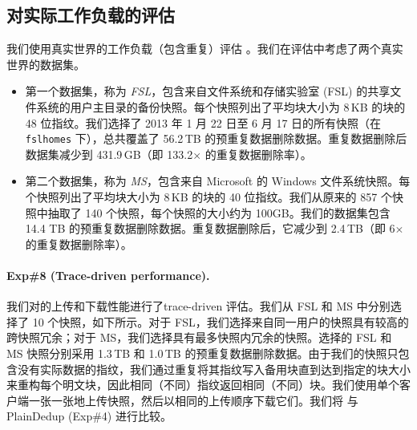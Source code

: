 \subsection{对实际工作负载的评估}
\label{subsec:real-world}

我们使用真实世界的工作负载（包含重复）评估 \sysnameS。我们在评估中考虑了两个真实世界的数据集。
\begin{itemize}[leftmargin=*]
\item 第一个数据集，称为 \textit{ FSL}，包含来自文件系统和存储实验室 (FSL) \cite{fsl,sun16} 的共享文件系统的用户主目录的备份快照。每个快照列出了平均块大小为 8\,KB 的块的 48 位指纹。我们选择了 2013 年 1 月 22 日至 6 月 17 日的所有快照（在 \texttt{fslhomes} 下），总共覆盖了 56.2\,TB 的预重复数据删除数据。重复数据删除后数据集减少到 431.9\,GB（即 133.2$\times$ 的重复数据删除率）。
\item 第二个数据集，称为 \textit{ MS}，包含来自 Microsoft \cite{meyer11} 的 Windows 文件系统快照。每个快照列出了平均块大小为 8\,KB 的块的 40 位指纹。我们从原来的 857 个快照中抽取了 140 个快照，每个快照的大小约为 100GB。我们的数据集包含 14.4 TB 的预重复数据删除数据。重复数据删除后，它减少到 2.4\,TB（即 6$\times$ 的重复数据删除率）。
\end{itemize}



\paragraph{Exp\#8 (Trace-driven performance).} 我们对\sysnameS 的上传和下载性能进行了trace-driven 评估。我们从 FSL 和 MS 中分别选择了 10 个快照，如下所示。对于 FSL，我们选择来自同一用户的快照具有较高的跨快照冗余；对于 MS，我们选择具有最多快照内冗余的快照。选择的 FSL 和 MS 快照分别采用 1.3\,TB 和 1.0\,TB 的预重复数据删除数据。由于我们的快照只包含没有实际数据的指纹，我们通过重复将其指纹写入备用块直到达到指定的块大小来重构每个明文块，因此相同（不同）指纹返回相同（不同）块。我们使用单个客户端一张一张地上传快照，然后以相同的上传顺序下载它们。我们将 \sysnameS 与 PlainDedup (Exp\#4) 进行比较。

